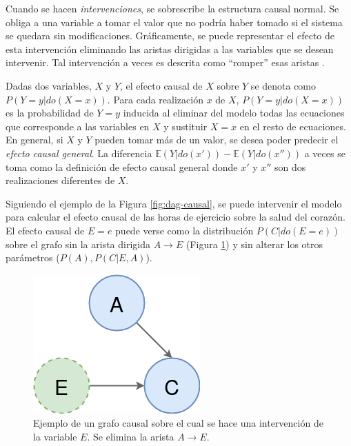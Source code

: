 Cuando se hacen \textit{intervenciones},
se sobrescribe la estructura causal normal. Se obliga a una
variable a tomar el valor que no podría haber tomado 
si el sistema se quedara sin modificaciones.
Gráficamente, se puede representar el
efecto de esta intervención eliminando las aristas 
dirigidas a las variables que se desean intervenir. Tal
intervención a veces es descrita como ``romper'' esas aristas \cite{sep-causal-models}.

Dadas dos variables, $X$ y $Y$,
el efecto causal de $X$ sobre $Y$ se denota como $P(Y=y|do(X=x))$. Para 
cada realización $x$ de $X$, $P(Y=y| do(X=x))$ es la probabilidad de $Y=y$ 
inducida al eliminar del modelo todas las ecuaciones que corresponde a las
variables en $X$ y sustituir $X=x$ en el resto de ecuaciones.
En general, si $X$ y $Y$ pueden tomar más de un valor, se desea poder
predecir el \textit{efecto causal general}.
La diferencia $\mathbb{E}(Y|do(x'))- \mathbb{E}(Y|do(x''))$ a veces
se toma como la definición de efecto causal general \cite{theoryofcausalities2006, pearl2016causal}
donde $x'$ y $x''$ son dos realizaciones diferentes de $X$.

Siguiendo el ejemplo de la Figura \ref{fig:dag-causal}, se puede intervenir
el modelo para calcular el efecto causal de las horas
de ejercicio sobre la salud del corazón. El efecto causal de $E=e$ puede 
verse como la distribución $P(C | do(E=e))$ sobre el grafo sin la arista
dirigida $A \rightarrow E$ (Figura \ref{fig:dag-intervention}) y sin alterar los otros parámetros ($P(A), P(C|E, A)$).

\begin{figure}
    \centering
    \includegraphics[scale=0.35]{Chapter2/Figs/example-dag-intervention.png}
    \caption{Ejemplo de un grafo causal sobre el cual se hace una intervención de
    la variable $E$. Se elimina la arista $A \rightarrow E$.}
    \label{fig:dag-intervention}
\end{figure}

